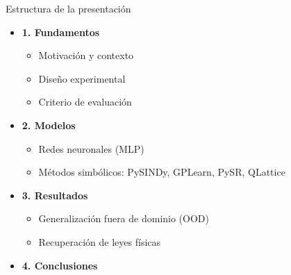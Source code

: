 \documentclass[10pt, aspectratio=169]{beamer}
\begin{document}
\begin{frame}{Estructura de la presentación}
\small

\begin{itemize}
    \item[] \textbf{1. Fundamentos}
    {\footnotesize
    \begin{itemize}
        \item Motivación y contexto
        \item Diseño experimental
        \item Criterio de evaluación
    \end{itemize}}
    
    \vspace{0.3em}
    
    \item[] \textbf{2. Modelos}
    {\footnotesize
    \begin{itemize}
        \item Redes neuronales (MLP)
        \item Métodos simbólicos: PySINDy, GPLearn, PySR, QLattice
    \end{itemize}}
    
    \vspace{0.3em}
    
    \item[] \textbf{3. Resultados}
    {\footnotesize
    \begin{itemize}
        \item Generalización fuera de dominio (OOD)
        \item Recuperación de leyes físicas
    \end{itemize}}
    
    \vspace{0.3em}
    
    \item[] \textbf{4. Conclusiones}
\end{itemize}

\end{frame}

\end{document}
